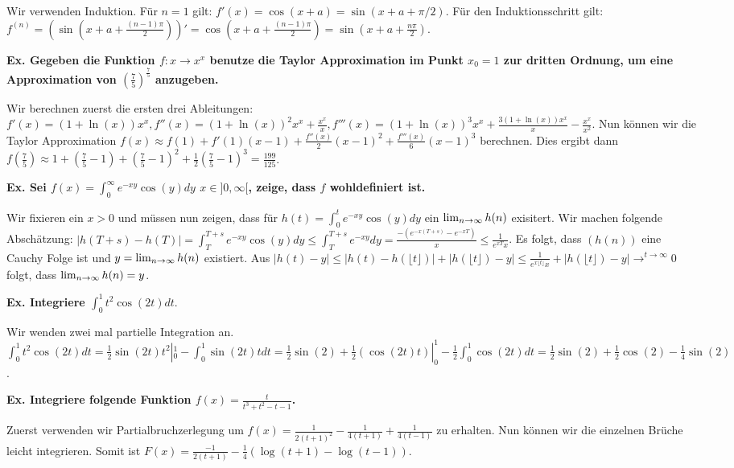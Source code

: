 Wir verwenden Induktion. Für $n = 1$ gilt: $f'(x) = \cos(x + a) = \sin(x + a + \pi/2)$.
Für den Induktionsschritt gilt: $f^{(n)} = (\sin(x + a + \frac{(n-1)\pi}{2}))' =
\cos(x + a + \frac{(n-1)\pi}{2}) = \sin(x + a + \frac{n\pi}{2})$. \medskip

\textbf{Ex. Gegeben die Funktion $f : x \to x^x$ benutze die Taylor Approximation im Punkt $x_0 = 1$
zur dritten Ordnung, um eine Approximation von $(\frac{7}{5})^{\frac{7}{5}}$ anzugeben.} 

Wir berechnen zuerst die ersten drei Ableitungen: $f'(x) = (1 + \ln(x))x^x, f''(x) = (1 + \ln(x))^2x^x + \frac{x^x}{x},
f'''(x) = (1 + \ln(x))^3x^x  + \frac{3(1+\ln(x))x^x}{x} - \frac{x^x}{x^2}$. Nun können wir die Taylor
Approximation $f(x) \approx f(1) + f'(1)(x-1) + \frac{f''(x)}{2}(x-1)^2 + \frac{f'''(x)}{6}(x-1)^3$ 
berechnen. Dies ergibt dann $f(\frac{7}{5}) \approx 1 + (\frac{7}{5} - 1) + (\frac{7}{5} - 1)^2 + \frac{1}{2} (\frac{7}{5} - 1)^3
= \frac{199}{125}$. \medskip

\textbf{Ex. Sei $f(x) = \int_0^\infty e^{-xy}\cos(y)dy$ $x \in ]0, \infty[$, zeige, dass $f$ wohldefiniert ist.}

Wir fixieren ein $x > 0$ und müssen nun zeigen, dass für $h(t) = \int_0^t e^{-xy}\cos(y)dy$ ein 
$\lim_{n \rightarrow \infty} h(n)$ exisitert. Wir machen folgende Abschätzung: $|h(T + s) - h(T)| = \int_T^{T+s} e^{-xy}\cos(y)dy
\leq \int_T^{T+s} e^{-xy}dy = \frac{-(e^{-x(T+s)} - e^{-xT})}{x} \leq \frac{1}{e^{xT}x}$. Es folgt,
dass $(h(n))$ eine Cauchy Folge ist und $y = \lim_{n \rightarrow \infty} h(n)$ existiert. Aus $|h(t) - y| \leq |h(t) - 
h(\lfloor t \rfloor)| + |h(\lfloor t \rfloor) - y| \leq \frac{1}{e^{x \lfloor t \rfloor}x} + 
|h(\lfloor t \rfloor) - y| \to^{t \to \infty} 0$ folgt, dass $\lim_{n \rightarrow \infty} h(n) = y$. \medskip

\textbf{Ex. Integriere $\int_0^1 t^2 \cos(2t)dt$}.

Wir wenden zwei mal partielle Integration an. $\int_0^1 t^2 \cos(2t)dt = \frac{1}{2}\sin(2t)t^2|_0^1
- \int_0^1\sin(2t)tdt = \frac{1}{2}\sin(2)+ \frac{1}{2}(\cos(2t)t)|_0^1-\frac{1}{2}\int_0^1\cos(2t)dt
= \frac{1}{2}\sin(2)+ \frac{1}{2}\cos(2) - \frac{1}{4}\sin(2)$. \medskip

\textbf{Ex. Integriere folgende Funktion $f(x) = \frac{t}{t^3 + t^2 - t -1}$.} 

Zuerst verwenden wir Partialbruchzerlegung um $f(x) = \frac{1}{2(t+1)^2} - \frac{1}{4(t+1)} + \frac{1}{4(t-1)}$
zu erhalten. Nun können wir die einzelnen Brüche leicht integrieren. Somit ist $F(x) = \frac{-1}{2(t+1)}
- \frac{1}{4}(\log(t+1) - \log(t-1))$. \medskip

